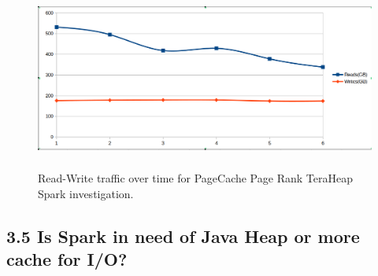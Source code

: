 \documentclass[twocolumn,10pt]{asme2e}
\begin{document}
\begin{figure}[h!]
        \includegraphics[width=12cm,height=6cm]{rw_pr_pc_th.png}
	\caption{Read-Write traffic over time for PageCache Page Rank TeraHeap Spark investigation.}
	\label{fig:rw_pr_pc_th}
\end{figure}
\fi
\subsection*{3.5 Is Spark in need of Java Heap or more cache for I/O?}
\end{document}
